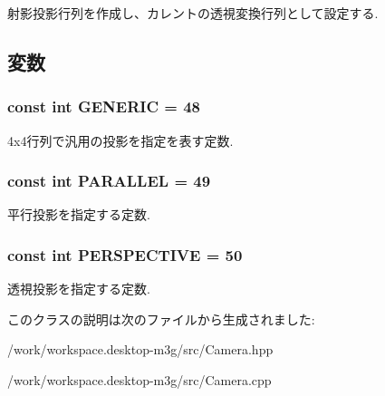 射影投影行列を作成し、カレントの透視変換行列として設定する. 

\subsection{変数}
\hypertarget{classm3g_1_1Camera_48a4e153c97a1f4890558a77dfe02ca4}{
\subsubsection[{GENERIC}]{\setlength{\rightskip}{0pt plus 5cm}const int {\bf GENERIC} = 48}}
\label{classm3g_1_1Camera_48a4e153c97a1f4890558a77dfe02ca4}


4x4行列で汎用の投影を指定を表す定数. \hypertarget{classm3g_1_1Camera_d9630da0e9505afbb107c86229aa2f08}{
\subsubsection[{PARALLEL}]{\setlength{\rightskip}{0pt plus 5cm}const int {\bf PARALLEL} = 49}}
\label{classm3g_1_1Camera_d9630da0e9505afbb107c86229aa2f08}


平行投影を指定する定数. \hypertarget{classm3g_1_1Camera_e62e72bde93e7d7ceb482e7a8c40dcf5}{
\subsubsection[{PERSPECTIVE}]{\setlength{\rightskip}{0pt plus 5cm}const int {\bf PERSPECTIVE} = 50}}
\label{classm3g_1_1Camera_e62e72bde93e7d7ceb482e7a8c40dcf5}


透視投影を指定する定数. 

このクラスの説明は次のファイルから生成されました:\begin{CompactItemize}
\item 
/work/workspace.desktop-m3g/src/Camera.hpp\item 
/work/workspace.desktop-m3g/src/Camera.cpp\end{CompactItemize}
